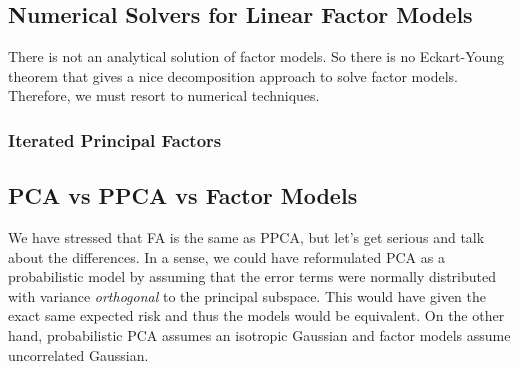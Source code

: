 \subsection{Numerical Solvers for Linear Factor Models}
  
  There is not an analytical solution of factor models. So there is no Eckart-Young theorem that gives a nice decomposition approach to solve factor models. Therefore, we must resort to numerical techniques. 

\subsubsection{Iterated Principal Factors}

  \begin{algo}
    
  \end{algo}

\subsection{PCA vs PPCA vs Factor Models} 

  We have stressed that FA is the same as PPCA, but let's get serious and talk about the differences. In a sense, we could have reformulated PCA as a probabilistic model by assuming that the error terms were normally distributed with variance \textit{orthogonal} to the principal subspace. This would have given the exact same expected risk and thus the models would be equivalent. On the other hand, probabilistic PCA assumes an isotropic Gaussian and factor models assume uncorrelated Gaussian. 

